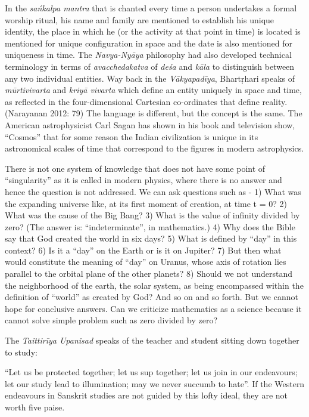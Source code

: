 In the \textit{sańkalpa mantra} that is chanted every time a person undertakes a formal worship ritual, his name and family are mentioned to establish his unique identity, the place in which he (or the activity at that point in time) is located is mentioned for unique configuration in space and the date is also mentioned for uniqueness in time. The \textit{Navya-Nyāya} philosophy had also developed technical terminology in terms of \textit{avacchedakatva} of \textit{deśa} and \textit{kāla} to distinguish between any two individual entities. Way back in the \textit{Vākyapadīya}, Bhartṛhari speaks of \textit{mūrtivivarta} and \textit{kriyā vivarta} which define an entity uniquely in space and time, as reflected in the four-dimensional Cartesian co-ordinates that define reality. (Narayanan 2012: 79) The language is different, but the concept is the same. The American astrophysicist Carl Sagan has shown in his book and television show, “Cosmos” that for some reason the Indian civilization is unique in its astronomical scales of time that correspond to the figures in modern astrophysics.

There is not one system of knowledge that does not have some point of “singularity” as it is called in modern physics, where there is no answer and hence the question is not addressed. We can ask questions such as - 1) What was the expanding universe like, at its first moment of creation, at time t = 0? 2) What was the cause of the Big Bang? 3) What is the value of infinity divided by zero? (The answer is: “indeterminate”, in mathematics.) 4) Why does the Bible say that God created the world in six days? 5) What is defined by “day” in this context? 6) Is it a “day” on the Earth or is it on Jupiter? 7) But then what would constitute the meaning of “day” on Uranus, whose axis of rotation lies parallel to the orbital plane of the other planets? 8) Should we not understand the neighborhood of the earth, the solar system, as being encompassed within the definition of “world” as created by God? And so on and so forth. But we cannot hope for conclusive answers. Can we criticize mathematics as a science because it cannot solve simple problem such as zero divided by zero?

The \textit{Taittirīya Upanisad} speaks of the teacher and student sitting down together to study: 

“Let us be protected together; let us sup together; let us join in our endeavours; let our study lead to illumination; may we never succumb to hate”. If the Western endeavours in Sanskrit studies are not guided by this lofty ideal, they are not worth five paise.


